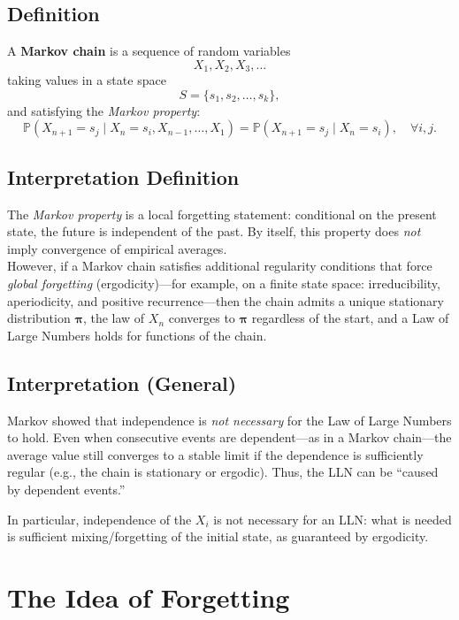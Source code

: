\subsection*{Definition}

A \textbf{Markov chain} is a sequence of random variables
\[
X_1, X_2, X_3, \dots
\]
taking values in a state space
\[
S = \{ s_1, s_2, \dots, s_k \},
\]
and satisfying the \emph{Markov property}:
\[
\mathbb{P}(X_{n+1} = s_j \mid X_n = s_i, X_{n-1}, \dots, X_1)
= \mathbb{P}(X_{n+1} = s_j \mid X_n = s_i),
\quad \forall i,j.
\]

\subsection*{Interpretation Definition}

The \emph{Markov property} is a local forgetting statement: conditional on the
present state, the future is independent of the past. By itself, this property
does \emph{not} imply convergence of empirical averages.\\ 

However, if a Markov chain satisfies additional regularity conditions that
force \emph{global forgetting} (ergodicity)—for example, on a finite state space:
irreducibility, aperiodicity, and positive recurrence—then the chain admits a
unique stationary distribution $\boldsymbol{\pi}$, the law of $X_n$ converges to
$\boldsymbol{\pi}$ regardless of the start, and a Law of Large Numbers holds
for functions of the chain.

\subsection*{Interpretation (General)}

Markov showed that independence is \emph{not necessary} for the Law of Large Numbers
to hold.  Even when consecutive events are dependent---as in a Markov chain---the
average value still converges to a stable limit if the dependence is sufficiently
regular (e.g., the chain is stationary or ergodic).  Thus, the LLN can be
``caused by dependent events.''


\noindent
In particular, independence of the $X_i$ is not necessary for an LLN:
what is needed is sufficient mixing/forgetting of the initial state, as
guaranteed by ergodicity.





\section{The Idea of Forgetting}

